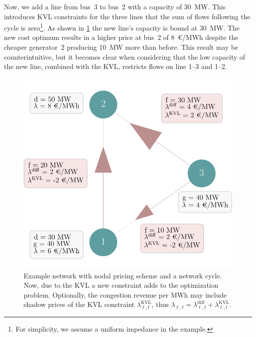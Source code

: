 \documentclass[11pt,twocolumn]{article}
\newcommand{\lmp}[1][n]{\lambda_{#1,t}}
\newcommand{\lmpdiff}[1][\ell]{\lmp[#1]^\text{diff}}
\newcommand{\lmpkvl}[1][\ell]{\lmp[#1]^\text{KVL}}
\begin{document}
Now, we add a line from bus~3 to bus~2 with a capacity of 30~MW. This introduces \ac{KVL} constraints for the three lines that the sum of flows following the cycle is zero\footnote{For simplicity, we assume a uniform impedance in the example.}. As shown in \cref{fig:example-network} the new line's capacity is bound at 30~MW. The new cost optimum results in a higher price at bus~2 of 8~\euro/MWh despite the cheaper generator~2 producing 10~MW more than before. This result may be counterintuitive, but it becomes clear when considering that the low capacity of the new line, combined with the \ac{KVL}, restricts flows on line 1--3 and 1--2.   

\begin{figure}[h!]
        \includegraphics[width=\linewidth]{example-with-cycles/network}
        \caption{Example network with nodal pricing scheme and a network cycle. Now, due to the \ac{KVL} a new constraint adds to the optimization problem. Optionally, the congestion revenue per MWh may include shadow prices of the \ac{KVL} constraint $\lmpkvl$, thus $\lmp[\ell] = \lmpdiff + \lmpkvl$.}
        \label{fig:example-network}            
\end{figure}
\end{document}
